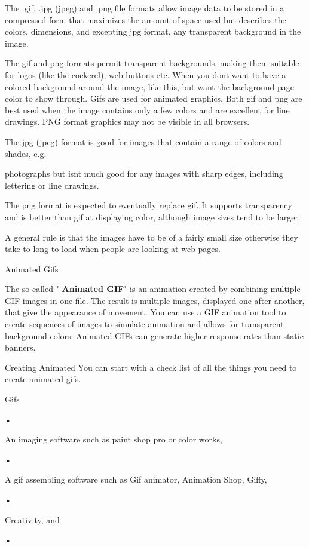 \documentclass[
]{article}
\begin{document}
The .gif, .jpg (jpeg) and .png file formats allow image data to be
stored in a compressed form that maximizes the amount of space used but
describes the colors, dimensions, and excepting jpg format, any
transparent background in the image.

The gif and png formats permit transparent backgrounds, making them
suitable for logos (like the cockerel), web buttons etc. When you
don\textquotesingle t want to have a colored background around the
image, like this, but want the background page color to show through.
Gifs are used for animated graphics. Both gif and png are best used when
the image contains only a few colors and are excellent for line
drawings. PNG format graphics may not be visible in all browsers.

The jpg (jpeg) format is good for images that contain a range of colors
and shades, e.g.

photographs but isn\textquotesingle t much good for any images with
sharp edges, including lettering or line drawings.

The png format is expected to eventually replace gif. It supports
transparency and is better than gif at displaying color, although image
sizes tend to be larger.

A general rule is that the images have to be of a fairly small size
otherwise they take to long to load when people are looking at web
pages.

Animated Gifs

The so-called " \textbf{Animated GIF}" is an animation created by
combining multiple GIF images in one file. The result is multiple
images, displayed one after another, that give the appearance of
movement. You can use a GIF animation tool to create sequences of images
to simulate animation and allows for transparent background colors.
Animated GIFs can generate higher response rates than static banners.

Creating Animated You can start with a check list of all the things you
need to create animated gifs.

Gifs

•

An imaging software such as paint shop pro or color works,

•

A gif assembling software such as Gif animator, Animation Shop, Giffy,

•

Creativity, and

•
\end{document}
